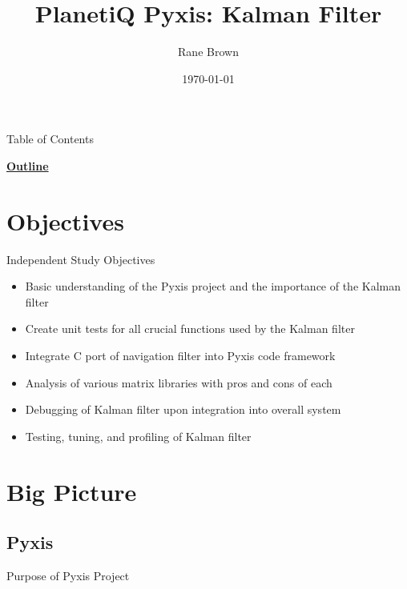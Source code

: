 \documentclass[10pt, handout, aspectratio=169]{beamer}
\title{PlanetiQ Pyxis: Kalman Filter}
\institute{University of Colorado Boulder}
\author{Rane Brown}
\date{\today}
\begin{document}
\begin{frame}[t,plain] %
    \titlepage
\end{frame}

\begin{frame}[t]{Table of Contents}
	\begin{center}
		\vspace{-2em}
		{\Large \textbf{\underline{Outline}}}
		\vspace{1em}
	\end{center}
	\begin{multicols}{2}
		\tableofcontents
	\end{multicols}
\end{frame} 

\section{Objectives}%

	\begin{frame}{Independent Study Objectives}
		\begin{itemize}
			\item Basic understanding of the Pyxis project and the importance of the Kalman filter
			\item Create unit tests for all crucial functions used by the Kalman filter
			\item Integrate C port of navigation filter into Pyxis code framework
			\item Analysis of various matrix libraries with pros and cons of each
			\item Debugging of Kalman filter upon integration into overall system
			\item Testing, tuning, and profiling of Kalman filter
		\end{itemize}
	\end{frame}

\section{Big Picture}%

\subsection{Pyxis}
	\begin{frame}{Purpose of Pyxis Project}
	\color{red}{ADD GOOD DESCRIPTION}
	\end{frame}
\end{document}
